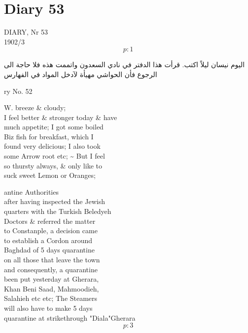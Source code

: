\documentclass{article}
\begin{document}
\newcommand{\mnote}[1] {\marginpar{\scriptsize \raggedright #1 }}


	\chapter{Diary 53\ \\}

	\marginpar{}

	\par{
 	DIARY, Nr 53\ \\1902/3\ \\
  \[p: 1 \]

	}


\begin{Arabic}
 اليوم نيسان ليلاً اكتب. قرأت هذا الدفتر في نادي السعدون واتممت هذه فلا حاجة الى الرجوع فأن الحواشي مهيأة لآدخل المواد في الفهارس
\end{Arabic}




	\par{
 	ry No. 52\ \\
	}

	\par{
 	W. breeze \& cloudy;\ \\I feel better \& stronger today \& have\ \\much appetite; I got some boiled\ \\Biz fish for breakfast, which I\ \\found very delicious; I also took\ \\some Arrow root etc; \~{} But I feel\ \\so thursty always, \& only like to\ \\suck sweet Lemon or Oranges;\ \\
	}

	\par{
 	antine Authorities\ \\after having inspected the Jewish\ \\quarters with the Turkish Beledyeh\ \\Doctors \& referred the matter\ \\to Constanple, a decision came\ \\to establish a Cordon around\ \\Baghdad of 5 days quarantine\ \\on all those that leave the town\ \\and consequently, a quarantine\ \\been put yesterday at Gherara,\ \\Khan Beni Saad, Mahmoodieh,\ \\Salahieh etc etc; The Steamers\ \\will also have to make 5 days\ \\quarantine at \lbrack strikethrough "Diala"\rbrack Gherara\ \\
  \[p: 3 \]

	}
\end{document}
